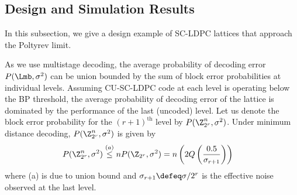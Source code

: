 \documentclass[conference]{IEEEtran}
\begin{document}


\subsection{Design and Simulation Results}
In this subsection, we give a design example of SC-LDPC lattices that approach the Poltyrev limit.

As we use multistage decoding, the average probability of decoding error $P(\Lmb,\sigma^{2})$ can be union bounded by the sum of block error probabilities at individual levels. Assuming CU-SC-LDPC code at each level is operating below the BP threshold, the average probability of decoding error of the lattice is dominated by the performance of the last (uncoded) level. Let us denote the block error probability for the $(r+1)^{\text{th}}$ level by $P(\Z_{2^r}^{n},\sigma^{2})$. Under minimum distance decoding, $P(\Z_{2^r}^{n},\sigma^{2})$ is given by
\begin{align}
P(\Z_{2^r}^{n},\sigma^{2})&\overset{(a)}\leq nP(\Z_{2^r},\sigma^{2})=n\left(2Q\left(\frac{0.5}{\sigma_{r+1}}\right)	\right)
\label{ZLatticeProb}
\end{align}
where (a) is due to union bound and $\sigma_{r+1}\defeq \sigma/2^r$ is the effective noise observed at the last level.
\end{document}
